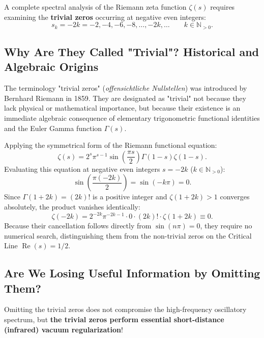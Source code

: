 \documentclass[11pt,a4paper]{article}
\begin{document}
A complete spectral analysis of the Riemann zeta function $\zeta(s)$ requires examining the \textbf{trivial zeros} occurring at negative even integers:
\begin{equation}
s_k = -2k = -2, -4, -6, -8, \dots, -2k, \dots \qquad k \in \mathbb{N}_{>0}.
\end{equation}

\subsection{Why Are They Called "Trivial"? Historical and Algebraic Origins}
The terminology "trivial zeros" (\emph{offensichtliche Nullstellen}) was introduced by Bernhard Riemann in 1859. They are designated as "trivial" not because they lack physical or mathematical importance, but because their existence is an immediate algebraic consequence of elementary trigonometric functional identities and the Euler Gamma function $\Gamma(s)$.

Applying the symmetrical form of the Riemann functional equation:
\begin{equation}
\zeta(s) = 2^s \pi^{s-1} \sin\left( \frac{\pi s}{2} \right) \Gamma(1 - s) \zeta(1 - s).
\end{equation}
Evaluating this equation at negative even integers $s = -2k$ ($k \in \mathbb{N}_{>0}$):
\begin{equation}
\sin\left( \frac{\pi (-2k)}{2} \right) = \sin(-k \pi) = 0.
\end{equation}
Since $\Gamma(1 + 2k) = (2k)!$ is a positive integer and $\zeta(1 + 2k) > 1$ converges absolutely, the product vanishes identically:
\begin{equation}
\zeta(-2k) = 2^{-2k} \pi^{-2k-1} \cdot 0 \cdot (2k)! \cdot \zeta(1 + 2k) \equiv 0.
\end{equation}
Because their cancellation follows directly from $\sin(n\pi) = 0$, they require no numerical search, distinguishing them from the non-trivial zeros on the Critical Line $\operatorname{Re}(s) = 1/2$.

\subsection{Are We Losing Useful Information by Omitting Them?}
Omitting the trivial zeros does not compromise the high-frequency oscillatory spectrum, but \textbf{the trivial zeros perform essential short-distance (infrared) vacuum regularization}!
\end{document}
